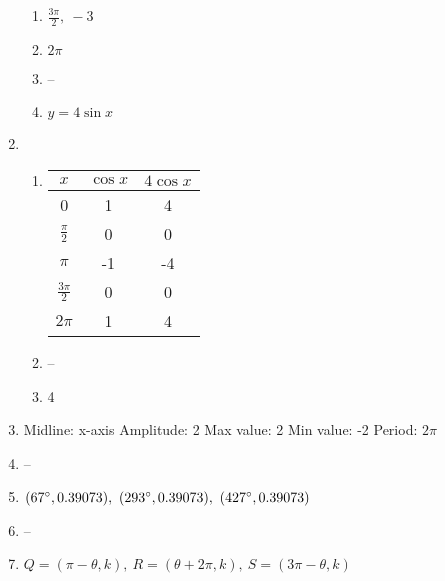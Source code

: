 \documentclass{article}
\begin{document}
\begin{enumerate}
\begin{enumerate}
	\item $\frac{3\pi}{2}, \ -3$
	
	\item $2\pi$
	
	\item --
	
	\item $y = 4\sin{x}$
	
	\end{enumerate}
	
\item 

	\begin{enumerate}
	
	\item
	\begin{tabular}{ c | c | c }
	$x$ & $\cos{x}$ & $4\cos{x}$ \\
	\hline
	0 & 1 & 4 \\
	$\frac{\pi}{2}$ & 0 & 0 \\
	$\pi$ & -1 & -4 \\
	$\frac{3\pi}{2}$ & 0 & 0 \\
	$2\pi$ & 1 & 4
	\end{tabular}
	
	\item --
	
	\item 4
	
	\end{enumerate}
	
\item Midline: x-axis \newline
	Amplitude: 2 \newline
	Max value: 2 \newline
	Min value: -2 \newline
	Period: $2\pi$

\item --

\item $(67\degree, 0.39073), \ (293\degree, 0.39073), \ (427\degree, 0.39073)$

\item --

\item $Q = (\pi - \theta, k), \ R = (\theta + 2\pi, k), \ S = (3\pi - \theta, k)$

\end{enumerate}
\end{document}
